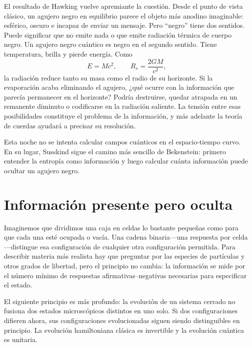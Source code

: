 El resultado de Hawking vuelve apremiante la cuestión. Desde el punto de vista clásico, un agujero negro en equilibrio parece el objeto más anodino imaginable: esférico, oscuro e incapaz de enviar un mensaje. Pero ``negro'' tiene dos sentidos. Puede significar que no emite nada o que emite radiación térmica de cuerpo negro. Un agujero negro cuántico es negro en el segundo sentido. Tiene temperatura, brilla y pierde energía. Como
\begin{equation}
E=Mc^2,
\qquad
R_s=\frac{2GM}{c^2},
\end{equation}
la radiación reduce tanto su masa como el radio de su horizonte. Si la evaporación acaba eliminando el agujero, ¿qué ocurre con la información que parecía permanecer en el horizonte? Podría destruirse, quedar atrapada en un remanente diminuto o codificarse en la radiación saliente. La tensión entre esas posibilidades constituye el problema de la información, y más adelante la teoría de cuerdas ayudará a precisar su resolución.

Esta noche no se intenta calcular campos cuánticos en el espacio-tiempo curvo. En su lugar, Susskind sigue el camino más sencillo de Bekenstein: primero entender la entropía como información y luego calcular cuánta información puede ocultar un agujero negro.

\section{Información presente pero oculta}

Imaginemos que dividimos una caja en celdas lo bastante pequeñas como para que cada una esté ocupada o vacía. Una cadena binaria---una respuesta por celda---distingue esa configuración de cualquier otra configuración permitida. Para describir materia más realista hay que preguntar por las especies de partículas y otros grados de libertad, pero el principio no cambia: la información se mide por el número mínimo de respuestas afirmativas--negativas necesarias para especificar el estado.

\begin{classroomqa}
\end{classroomqa}

El siguiente principio es más profundo: la evolución de un sistema cerrado no fusiona dos estados microscópicos distintos en uno solo. Si dos configuraciones difieren ahora, sus configuraciones evolucionadas siguen siendo distinguibles en principio. La evolución hamiltoniana clásica es invertible y la evolución cuántica es unitaria.

